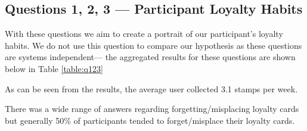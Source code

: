 \subsection{Questions 1, 2, 3 --- Participant Loyalty Habits}
With these questions we aim to create a portrait of our participant's loyalty habits. We do not use this question to compare our hypothesis as these questions are systems independent--- the aggregated results for these questions are shown below in Table \ref{table:q123}
    \begin{table}[H]
    \caption{Table showing answers to questions 1, 2 and 3 from the study}
    \label{table:q123}
    \end{table}

As can be seen from the results, the average user collected 3.1 stamps per week.

There was a wide range of answers regarding forgetting/misplacing loyalty cards but generally 50\% of participants tended to forget/misplace their loyalty cards.

